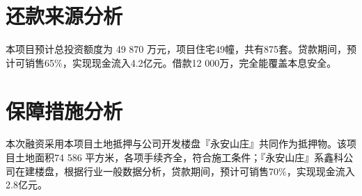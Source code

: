 \section{还款来源分析}
本项目预计总投资额度为 49 870 万元，项目住宅49幢，共有875套。贷款期间，预计可销售65\%，实现现金流入4.2亿元。借款12 000万，完全能覆盖本息安全。

\section{保障措施分析}
本次融资采用本项目土地抵押与公司开发楼盘『永安山庄』共同作为抵押物。该项目土地面积74 586 平方米，各项手续齐全，符合施工条件；『永安山庄』系鑫科公司在建楼盘，根据行业一般数据分析，贷款期间，预计可销售70\%，实现现金流入2.8亿元。














